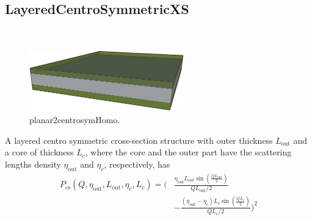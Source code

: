 \clearpage
\subsection{LayeredCentroSymmetricXS}
\label{sect:LayeredCentroSymmetricXS}
~\\

\begin{figure}[htb]
\begin{center}
\includegraphics[width=0.6\textwidth]{planar2centrosymm.png}
\end{center}
\caption{planar2centrosymHomo.}
\label{fig:planar2centrosymm}
\end{figure}
A layered centro symmetric cross-section structure with outer
thickness $L_\text{out}$ and a core of thickness $L_c$, where the
core and the outer part have the scattering lengths density
$\eta_\text{out}$ and $\eta_c$, respectively, has
\begin{align}
P_\text{cs}(Q,\eta_\text{out},L_\text{out},\eta_c,L_c)
= \Biggl( & \frac{\eta_\text{out}L_\text{out}\sin\left(\frac{QL_\text{out}}{2}\right)}{QL_\text{out}/2} \\
&-  \frac{(\eta_\text{out}-\eta_c)L_c\sin\left(\frac{QL_c}{2}\right)}{QL_c/2}\Biggr)^2 \nonumber
\end{align}


\clearpage
